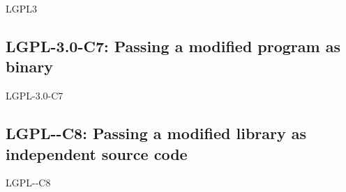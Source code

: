 \begin{license}{LGPL3}
\subsection{LGPL-3.0-C7: Passing a modified program as binary}
\begin{lsuc}{LGPL-3.0-C7}

  \useCaseSeven

  \begin{lsucrequires}
    \lsucmandatory{\keepLicensingElements}
    \lsucmandatory{\lgplthreeEnsureCopyrightNoticeBinary}
    \lsucmandatory{\giveLicense}\passingFilesCorrectly
    \lsucmandatory{\retainCopyrightNotices}
    \lsucmandatory{\markProgramModifications}
    \lsucmandatory{\addToCopyrightDialogApp}
    \lsucmandatory{\arrangeProgramChanges}\howToApplyTheseTerms
    \lsucmandatory{\makeModifiedSourceAvailable}
    \lsucmandatory{\describeHowToGetSource}  
    \lsucoptional{\createChangelog}  
    \lsucoptional{\addToDocumentation}
  \end{lsucrequires}

  \begin{lsucprohibits}
    \lsucitem{\noPatentLitigation}
  \end{lsucprohibits}
\end{lsuc}

\subsection{LGPL-\ver-C8: Passing a modified library as independent source code}
\begin{lsuc}{LGPL-\ver-C8}

  \useCaseEight

  \begin{lsucrequires}
    \lsucmandatory{\keepLicensingElements}
    \lsucmandatory{\lgplthreeEnsureCopyrightNoticeSource}
    \lsucmandatory{\giveLicense}\passingFilesCorrectly
    \lsucmandatory{\retainCopyrightNotices}
    \lsucmandatory{\markLibraryModifications}
    \lsucmandatory{\arrangeLibraryChanges}\howToApplyTheseTerms
    \lsucoptional{\createChangelog}  
    \lsucoptional{\addToDocumentation}
  \end{lsucrequires}

  \begin{lsucprohibits}
    \lsucitem{\noPatentLitigation}
  \end{lsucprohibits}
\end{lsuc}


\end{license}
